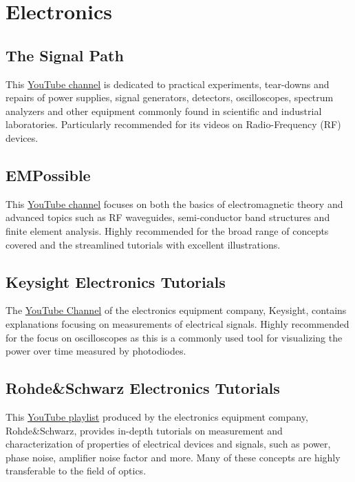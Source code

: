 \section{Electronics}
\subsection*{The Signal Path}
This \href{https://www.youtube.com/@Thesignalpath/videos}{YouTube channel} is dedicated to practical experiments, tear-downs and repairs of power supplies, signal generators, detectors, oscilloscopes, spectrum analyzers and other equipment commonly found in scientific and industrial laboratories. Particularly recommended for its videos on Radio-Frequency (RF) devices.

\subsection*{EMPossible}
This \href{https://www.youtube.com/@empossible1577/playlists}{YouTube channel} focuses on both the basics of electromagnetic theory and advanced topics such as RF waveguides, semi-conductor band structures and finite element analysis. Highly recommended for the broad range of concepts covered and the streamlined tutorials with excellent illustrations.  

\subsection*{Keysight Electronics Tutorials}
The \href{https://www.youtube.com/@KeysightLabs/videos}{YouTube Channel} of the electronics equipment company, Keysight, contains explanations focusing on measurements of electrical signals. Highly recommended for the focus on oscilloscopes as this is a commonly used tool for visualizing the power over time measured by photodiodes. 


\subsection*{Rohde\&Schwarz Electronics Tutorials}
This 
\href{https://www.youtube.com/watch?v=rUDMo7hwihs&list=PLKxVoO5jUTlvsVtDcqrVn0ybqBVlLj2z8}{YouTube playlist} produced by the electronics equipment company, Rohde\&Schwarz, provides in-depth tutorials on measurement and characterization of properties of electrical devices and signals, such as power, phase noise, amplifier noise factor and more. Many of these concepts are highly transferable to the field of optics. 



